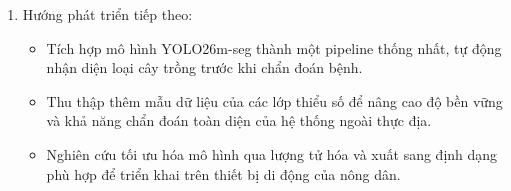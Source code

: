 \begin{enumerate}
\begin{itemize}
              \item Mô hình vẫn gặp khó khăn khi phát hiện các vết bệnh ở giai đoạn đầu có kích thước siêu nhỏ (chỉ vài pixel) do sự tiêu biến thông tin không gian qua các tầng trích xuất đặc trưng sâu.
              \item Sự tương đồng về mặt thị giác giữa một số loại bệnh (như Đốm nâu và Bệnh đạo ôn trên lúa, Bệnh nấm rỉ sắt và Bệnh đốm rong trên cà phê) làm gia tăng tỷ lệ phân loại nhầm lẫn nhãn lớp.
          \end{itemize}
    \item Hướng phát triển tiếp theo:
          \begin{itemize}
              \item Tích hợp mô hình YOLO26m-seg thành một pipeline thống nhất, tự động nhận diện loại cây trồng trước khi chẩn đoán bệnh.
              \item Thu thập thêm mẫu dữ liệu của các lớp thiểu số để nâng cao độ bền vững và khả năng chẩn đoán toàn diện của hệ thống ngoài thực địa.
              \item Nghiên cứu tối ưu hóa mô hình qua lượng tử hóa và xuất sang định dạng phù hợp để triển khai trên thiết bị di động của nông dân.
          \end{itemize}
\end{enumerate}

